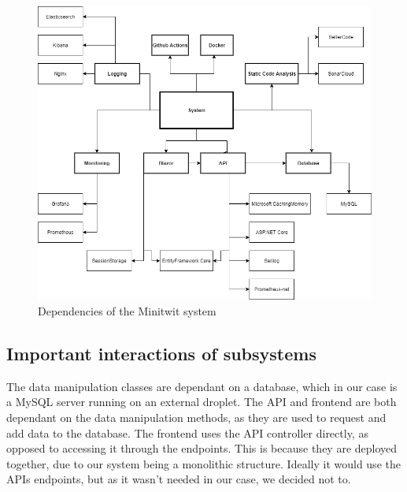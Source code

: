 \documentclass{article}
\begin{document}
\newpage
\begin{figure}[h!]
\centering
\includegraphics[width= \textwidth]{images/DependencyGraph.png}
\caption{Dependencies of the Minitwit system}
\end{figure}


\subsection{Important interactions of subsystems}
The data manipulation classes are dependant on a database, which in our case is a MySQL server running on an external droplet. The API and frontend are both dependant on the data manipulation methods, as they are used to request and add data to the database. The frontend uses the API controller directly, as opposed to accessing it through the endpoints. This is because they are deployed together, due to our system being a monolithic structure. Ideally it would use the APIs endpoints, but as it wasn't needed in our case, we decided not to.
\end{document}
